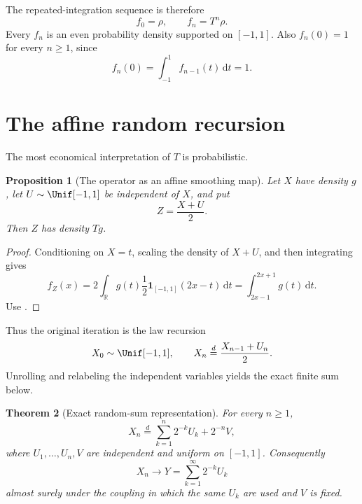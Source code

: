 \documentclass[11pt,oneside]{article}
\newtheorem{theorem}{Theorem}[section]
\newtheorem{proposition}[theorem]{Proposition}
\theoremstyle{definition}
\theoremstyle{remark}
\newcommand{\R}{\mathbb R}
\newcommand{\dd}{\,\mathrm d}
\begin{document}
The repeated-integration sequence is therefore
\begin{equation}
 f_0=\rho,\qquad f_n=T^n\rho.                               \label{repeated:eq:fn-def}
\end{equation}
Every $f_n$ is an even probability density supported on $[-1,1]$.  Also
$f_n(0)=1$ for every $n\ge1$, since
\begin{equation}
 f_n(0)=\int_{-1}^{1}f_{n-1}(t)\dd t=1.                    \label{repeated:eq:center-one}
\end{equation}

\section{The affine random recursion}
\label{repeated:sec:probability}

The most economical interpretation of $T$ is probabilistic.

\begin{proposition}[The operator as an affine smoothing map]
\label{repeated:prop:affine-map}
Let $X$ have density $g$, let $U\sim\Unif[-1,1]$ be independent of $X$, and put
\begin{equation}
 Z=\frac{X+U}{2}.                                           \label{repeated:eq:affine-Z}
\end{equation}
Then $Z$ has density $Tg$.
\end{proposition}

\begin{proof}
Conditioning on $X=t$, scaling the density of $X+U$, and then integrating gives
\[
 f_Z(x)=2\int_{\R}g(t)\frac12\mathbf 1_{[-1,1]}(2x-t)\dd t
       =\int_{2x-1}^{2x+1}g(t)\dd t.
\]
Use .
\end{proof}

Thus the original iteration is the law recursion
\begin{equation}
 X_0\sim\Unif[-1,1],\qquad
 X_n\overset d=\frac{X_{n-1}+U_n}{2}.                      \label{repeated:eq:Markov-recursion}
\end{equation}
Unrolling and relabeling the independent variables yields the exact finite sum below.

\begin{theorem}[Exact random-sum representation]
\label{repeated:thm:random-sum}
For every $n\ge1$,
\begin{equation}
 X_n\overset d=\sum_{k=1}^{n}2^{-k}U_k+2^{-n}V,            \label{repeated:eq:Xn-sum}
\end{equation}
where $U_1,\ldots,U_n,V$ are independent and uniform on $[-1,1]$.
Consequently
\begin{equation}
 X_n\longrightarrow Y=\sum_{k=1}^{\infty}2^{-k}U_k        \label{repeated:eq:Xn-coupling}
\end{equation}
almost surely under the coupling in which the same $U_k$ are used and $V$ is fixed.
\end{theorem}
\end{document}
